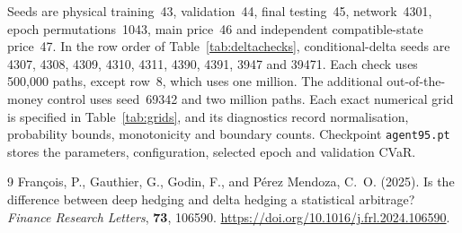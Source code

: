 \documentclass[11pt,a4paper]{article}
\theoremstyle{remark}
\begin{document}
Seeds are physical training~43, validation~44, final testing~45, network~4301, epoch permutations~1043, main price~46 and independent compatible-state price~47. In the row order of Table~\ref{tab:deltachecks}, conditional-delta seeds are 4307, 4308, 4309, 4310, 4311, 4390, 4391, 3947 and 39471. Each check uses 500,000 paths, except row~8, which uses one million. The additional out-of-the-money control uses seed~69342 and two million paths. Each exact numerical grid is specified in Table~\ref{tab:grids}, and its diagnostics record normalisation, probability bounds, monotonicity and boundary counts. Checkpoint \texttt{agent95.pt} stores the parameters, configuration, selected epoch and validation CVaR.

\begin{thebibliography}{9}
Fran\c{c}ois, P., Gauthier, G., Godin, F., and P\'erez Mendoza, C.~O. (2025).
Is the difference between deep hedging and delta hedging a statistical arbitrage?
\emph{Finance Research Letters}, \textbf{73}, 106590.
\url{https://doi.org/10.1016/j.frl.2024.106590}.
\end{thebibliography}
\end{document}
